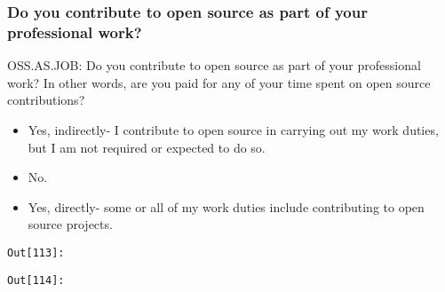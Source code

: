 \documentclass[11pt]{article}
\providecommand{\tightlist}{%
      \setlength{\itemsep}{0pt}\setlength{\parskip}{0pt}}
\begin{document}
    \subsubsection{Do you contribute to open source as part of your
professional
work?}\label{do-you-contribute-to-open-source-as-part-of-your-professional-work}

OSS.AS.JOB: Do you contribute to open source as part of your
professional work? In other words, are you paid for any of your time
spent on open source contributions?

\begin{itemize}
\tightlist
\item
  Yes, indirectly- I contribute to open source in carrying out my work
  duties, but I am not required or expected to do so.\\
\item
  No.\\
\item
  Yes, directly- some or all of my work duties include contributing to
  open source projects.
\end{itemize}

\texttt{\color{outcolor}Out[{\color{outcolor}113}]:}
    

    

\texttt{\color{outcolor}Out[{\color{outcolor}114}]:}
    

    
\end{document}
